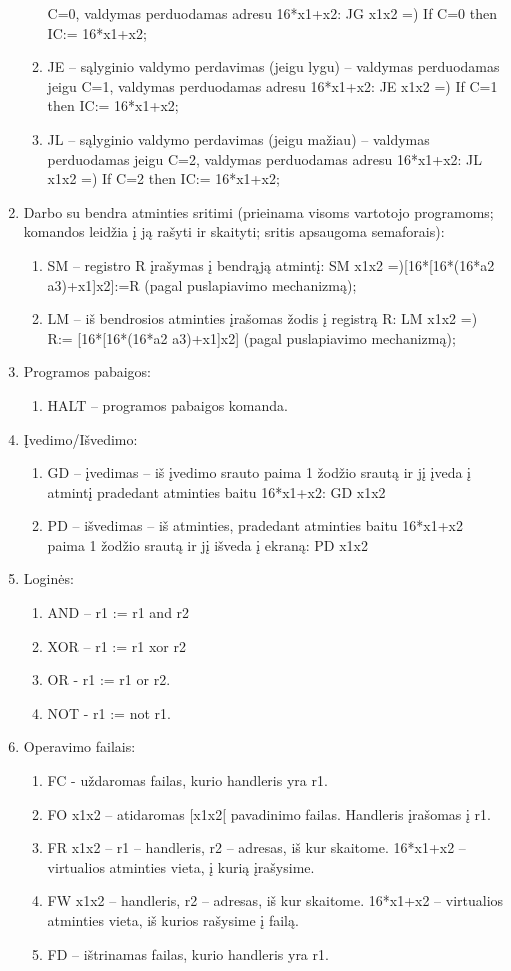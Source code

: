 \documentclass[oneside]{VUMIFPSkursinis}
\begin{document}
\begin{enumerate}
\begin{enumerate}
C=0, valdymas perduodamas adresu 16*x1+x2:
JG x1x2 =) If C=0 then IC:= 16*x1+x2;
\item JE – sąlyginio valdymo perdavimas (jeigu lygu) – valdymas perduodamas jeigu C=1,
valdymas perduodamas adresu 16*x1+x2:
JE x1x2 =) If C=1 then IC:= 16*x1+x2;
\item JL – sąlyginio valdymo perdavimas (jeigu mažiau) – valdymas perduodamas jeigu
C=2, valdymas perduodamas adresu 16*x1+x2:
JL x1x2 =) If C=2 then IC:= 16*x1+x2;
\end{enumerate}
\item Darbo su bendra atminties sritimi (prieinama visoms vartotojo programoms; komandos
leidžia į ją rašyti ir skaityti; sritis apsaugoma semaforais):
\begin{enumerate}
\item SM – registro R įrašymas į bendrąją atmintį:
SM x1x2 =)[16*[16*(16*a2 a3)+x1]x2]:=R (pagal puslapiavimo mechanizmą);
\item LM – iš bendrosios atminties įrašomas žodis į registrą R:
LM x1x2 =) R:= [16*[16*(16*a2 a3)+x1]x2] (pagal puslapiavimo mechanizmą);
\end{enumerate}
\item Programos pabaigos:
\begin{enumerate}
\item HALT – programos pabaigos komanda.
\end{enumerate}
\item Įvedimo/Išvedimo:
\begin{enumerate}
\item GD – įvedimas – iš įvedimo srauto paima 1 žodžio srautą ir jį įveda į atmintį
pradedant atminties baitu 16*x1+x2:
GD x1x2
\item PD – išvedimas – iš atminties, pradedant atminties baitu 16*x1+x2 paima 1 žodžio
srautą ir jį išveda į ekraną:
PD x1x2
\end{enumerate}
\item Loginės:
\begin{enumerate}
\item AND – r1 := r1 and r2
\item XOR – r1 := r1 xor r2
\item OR - r1 := r1 or r2.
\item NOT - r1 := not r1.
\end{enumerate}
\item Operavimo failais:
\begin{enumerate}
\item FC - uždaromas failas, kurio handleris yra r1.
\item FO x1x2 – atidaromas [x1x2[ pavadinimo failas. Handleris įrašomas į r1.
\item FR x1x2 – r1 – handleris, r2 – adresas, iš kur skaitome. 16*x1+x2 – virtualios atminties
vieta, į kurią įrašysime.
\item FW x1x2 – handleris, r2 – adresas, iš kur skaitome. 16*x1+x2 – virtualios atminties
vieta, iš kurios rašysime į failą.
\item FD – ištrinamas failas, kurio handleris yra r1.
\end{enumerate}
\end{enumerate}
\end{document}
